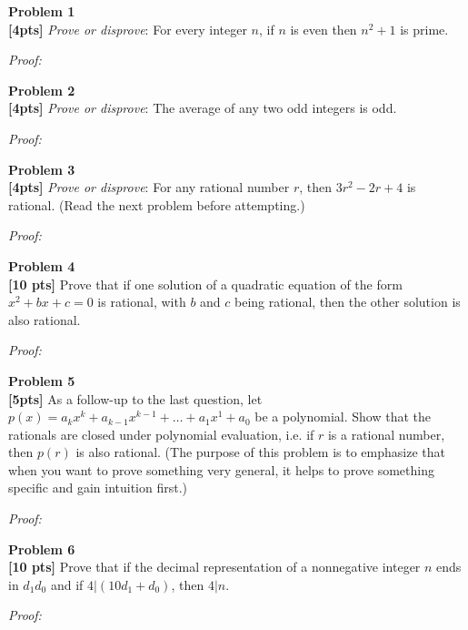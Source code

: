 \documentclass{article}
\newenvironment{problem}[2][Problem]
    { \begin{mdframed}[backgroundcolor=gray!20] \textbf{#1 #2} \\}
    {  \end{mdframed}}
\newenvironment{solution}
    {\textit{Proof:}}
    {}
\begin{document}
\begin{problem}{1}
\textbf{[4pts]} \textit{Prove or disprove}: For every integer $n$, if $n$ is even then $n^2 + 1$ is prime. 
\end{problem}
\begin{solution}
\end{solution}

\begin{problem}{2}
\textbf{[4pts]} \textit{Prove or disprove}: The average of any two odd integers is odd. 
\end{problem}
\begin{solution}
\end{solution}

\begin{problem}{3}
\textbf{[4pts]} \textit{Prove or disprove}: For any rational number $r$, then $3r^2 - 2r + 4$ is rational. (Read the next problem before attempting.)
\end{problem}
\begin{solution}
\end{solution}

\begin{problem}{4}
\textbf{[10 pts]} Prove that if one solution of a quadratic equation of the form $x^2 + bx + c = 0$ is rational, with $b$ and $c$ being rational, then the other solution is also rational.
\end{problem}
\begin{solution}
\end{solution}

\begin{problem}{5}
\textbf{[5pts]} As a follow-up to the last question, let $p(x) = a_k x^k + a_{k-1} x^{k-1} + \ldots + a_1 x^1 + a_0$ be a polynomial. Show that the rationals are closed under polynomial evaluation, i.e. if $r$ is a rational number, then $p(r)$ is also rational. (The purpose of this problem is to emphasize that when you want to prove something very general, it helps to prove something specific and gain intuition first.)
\end{problem}
\begin{solution}
\end{solution}

\begin{problem}{6}
\textbf{[10 pts]} Prove that if the decimal representation of a nonnegative integer $n$ ends in $d_1 d_0$ and if $4 | (10d_1 + d_0)$, then $4|n$.
\end{problem}
\begin{solution}
\end{solution}
\end{document}
